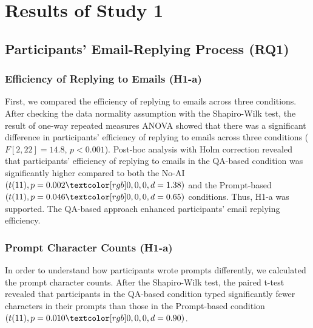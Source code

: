 

% 
\section{Results of Study 1}
\subsection{Participants' Email-Replying Process (RQ1)}
\label{sec:result1_RQ1}
\subsubsection{Efficiency of Replying to Emails (H1-a)}
\label{sec:result1_efficiency}
First, we compared the efficiency of replying to emails across three conditions.
After checking the data normality assumption with the Shapiro-Wilk test, the result of one-way repeated measures ANOVA showed that there was a significant difference in participants' efficiency of replying to emails across three conditions ($F[2, 22]=14.8$, $p<0.001$). 
Post-hoc analysis with Holm correction revealed that participants' efficiency of replying to emails in the QA-based condition was significantly higher compared to both the No-AI $(t(11), p=0.002\red{, d=1.38})$ and the Prompt-based $(t(11), p=0.046\red{, d=0.65})$ conditions.
Thus, H1-a was supported.
The QA-based approach enhanced participants’ email replying efficiency.

\subsubsection{Prompt Character Counts (H1-a)}
\label{sec:result1_prompt_character_counts}
In order to understand how participants wrote prompts differently, we calculated the prompt character counts.
After the Shapiro-Wilk test, the paired t-test revealed that participants in the QA-based condition typed significantly fewer characters in their prompts than those in the Prompt-based condition $(t(11), p=0.010\red{, d=0.90})$.

